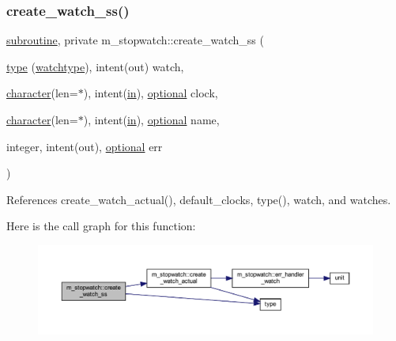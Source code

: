 \subsubsection{\texorpdfstring{create\+\_\+watch\+\_\+ss()}{create\_watch\_ss()}}
{\footnotesize\ttfamily \hyperlink{M__stopwatch_83_8txt_acfbcff50169d691ff02d4a123ed70482}{subroutine}, private m\+\_\+stopwatch\+::create\+\_\+watch\+\_\+ss (\begin{DoxyParamCaption}\item[{\hyperlink{stop__watch_83_8txt_a70f0ead91c32e25323c03265aa302c1c}{type} (\hyperlink{structm__stopwatch_1_1watchtype}{watchtype}), intent(out)}]{watch,  }\item[{\hyperlink{option__stopwatch_83_8txt_abd4b21fbbd175834027b5224bfe97e66}{character}(len=$\ast$), intent(\hyperlink{M__journal_83_8txt_afce72651d1eed785a2132bee863b2f38}{in}), \hyperlink{option__stopwatch_83_8txt_aa4ece75e7acf58a4843f70fe18c3ade5}{optional}}]{clock,  }\item[{\hyperlink{option__stopwatch_83_8txt_abd4b21fbbd175834027b5224bfe97e66}{character}(len=$\ast$), intent(\hyperlink{M__journal_83_8txt_afce72651d1eed785a2132bee863b2f38}{in}), \hyperlink{option__stopwatch_83_8txt_aa4ece75e7acf58a4843f70fe18c3ade5}{optional}}]{name,  }\item[{integer, intent(out), \hyperlink{option__stopwatch_83_8txt_aa4ece75e7acf58a4843f70fe18c3ade5}{optional}}]{err }\end{DoxyParamCaption})\hspace{0.3cm}{\ttfamily [private]}}



References create\+\_\+watch\+\_\+actual(), default\+\_\+clocks, type(), watch, and watches.

Here is the call graph for this function\+:
\nopagebreak
\begin{figure}[H]
\begin{center}
\leavevmode
\includegraphics[width=350pt]{namespacem__stopwatch_a189c66a0795f7cfe9b1f2d2be3248f2c_cgraph}
\end{center}
\end{figure}
\mbox{\label{namespacem__stopwatch_a67e6ae5ff7326a3b3f9effc4e4fff281}} 
